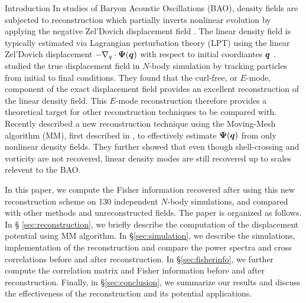 \begin{section}{Introduction}
  In studies of Baryon Acoustic Oscillations (BAO), density fields are
  subjected to reconstruction which partially inverts nonlinear
  evolution by applying the negative Zel'Dovich displacement field \cite{bib:Eisenstein2007}.
  The linear density field is
  typically estimated via Lagrangian perturbation theory (LPT)
  using the linear Zel'Dovich displacement $-\nabla_q\cdot\boldsymbol\Psi(\boldsymbol q)$
  with respect to initial coordiantes $\boldsymbol{q}$ \cite{bib:Zel1970}.
  \citet{bib:Yu2016} studied the true displacement field in $N$-body simulation by tracking 
  particles from initial to final conditions.  They found that the curl-free, or $E$-mode, 
  component of the exact displacement field provides an excellent reconstruction of 
  the linear density field.  This $E$-mode reconstruction therefore provides a theoretical 
  target for other reconstruction techniques to be compared with.
  Recently \citet{bib:Zhu2016} described a new reconstruction 
  technique using the Moving-Mesh
  algorithm (MM), first described in \cite{bib:Pen1995,bib:Pen1998},
  to effectively estimate $\boldsymbol{\Psi}(\boldsymbol{q})$ from only nonlinear
  density fields.  They further showed that even though shell-crossing
  and vorticity are not recovered, linear density modes are still 
  recovered up to scales relevent to the BAO.

  In this paper, we compute the Fisher information recovered after
  using this new reconstruction scheme on 130 independent $N$-body
  simulations, and compared with other methods and unreconstructed
  fields.  The paper is organized as follows.  In \S
  \ref{sec:reconstruction}, we briefly
  describe the computation of the displacement potential using MM
  algorithm. In \S \ref{sec:simulation}, we describe  
  the simulations, implementation of the reconstruction and compare 
  the power spectra and cross correlations before and after reconstruction.  
  In \S \ref{sec:fisherinfo}, we further compute the correlation matrix 
  and Fisher information before and
  after reconstruction.  Finally, in \S \ref{sec:conclusion}, we summarize 
  our results and 
  discuss the effectiveness of the reconstruction and its potential
  applications.


\end{section}

